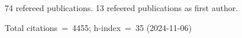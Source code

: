 74 refereed publications. 13 refeered publications as first author.

Total citations~=~4455; h-index~=~35 (2024-11-06)